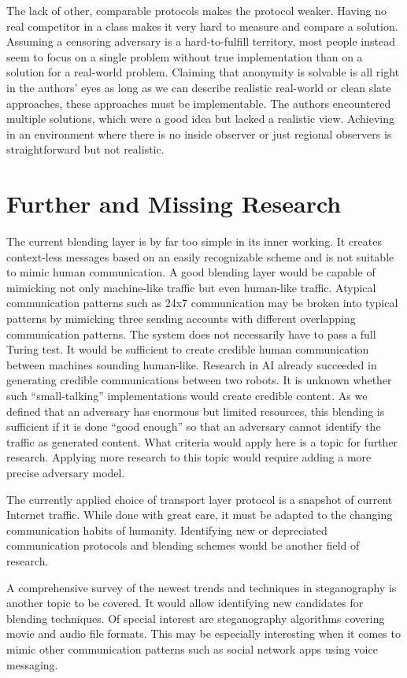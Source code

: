 The lack of other, comparable protocols makes the \MessageVortex{} protocol weaker. Having no real competitor in a class makes it very hard to measure and compare a solution. Assuming a censoring adversary is a hard-to-fulfill territory, most people instead seem to focus on a single problem without true implementation than on a solution for a real-world problem. Claiming that anonymity is solvable is all right in the authors' eyes as long as we can describe realistic real-world or clean slate approaches, these approaches must be implementable. The authors encountered multiple solutions, which were a good idea but lacked a realistic view. Achieving in an environment where there is no inside observer or just regional observers is straightforward but not realistic. 

\section{Further and Missing Research}
The current blending layer is by far too simple in its inner working. It creates context-less messages based on an easily recognizable scheme and is not suitable to mimic human communication. A good blending layer would be capable of mimicking not only machine-like traffic but even human-like traffic. Atypical communication patterns such as 24x7 communication may be broken into typical patterns by mimicking three sending accounts with different overlapping communication patterns. The system does not necessarily have to pass a full Turing test. It would be sufficient to create credible human communication between machines sounding human-like. Research in AI already succeeded in generating credible communications between two robots. It is unknown whether such ``small-talking'' implementations would create credible content. As we defined that an adversary has enormous but limited resources, this blending is sufficient if it is done ``good enough'' so that an adversary cannot identify the traffic as generated content. What criteria would apply here is a topic for further research. Applying more research to this topic would require adding a more precise adversary model.

The currently applied choice of transport layer protocol is a snapshot of current Internet traffic. While done with great care, it must be adapted to the changing communication habits of humanity. Identifying new or depreciated communication protocols and blending schemes would be another field of research.

A comprehensive survey of the newest trends and techniques in steganography is another topic to be covered. It would allow identifying new candidates for blending techniques. Of special interest are steganography algorithms covering movie and audio file formats. This may be especially interesting when it comes to mimic other communication patterns such as social network apps using voice messaging.

